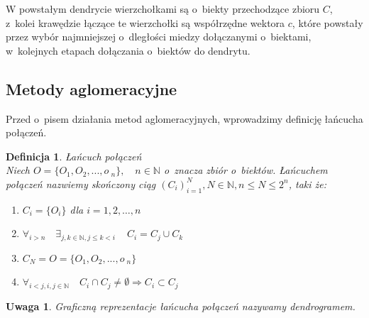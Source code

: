 \documentclass[12pt,a4paper]{report}
\newtheorem{definition}[theorem]{Definicja}
\newtheorem{uwaga}{Uwaga}
\begin{document}
W powstałym dendrycie wierzchołkami są o~biekty przechodzące zbioru $C$, z~kolei krawędzie łączące te wierzchołki są współrzędne wektora $c$, które powstały przez wybór najmniejszej o~dległości miedzy dołączanymi o~biektami, w~kolejnych etapach dołączania o~biektów do dendrytu. 

\subsection{Metody aglomeracyjne}

Przed o~pisem działania metod aglomeracyjnych, wprowadzimy definicję łańcucha połączeń.

\begin{definition}{Łańcuch połączeń}\\
Niech $O=\{O_{1},O_{2},..., o~_{n}\}, \quad n\in \mathbb{N}$ o~znacza zbiór o~biektów. Łańcuchem połączeń nazwiemy skończony ciąg $(C_{i})_{i=1}^{N},  N \in \mathbb{N}, n\leq N \leq 2^n$, taki że:
\begin{enumerate}
\item $C_{i}=\{O_{i}\}$ dla $i=1, 2, \ldots, n$
\item $\forall_{i > n} \quad \exists_{j, k \in \mathbb{N},  j\leq k < i~ } \quad C_{i}=C_{j} \cup C_{k}$
\item $C_{N}=O=\{O_{1},O_{2},..., o~_{n}\}$
\item $\forall_{i<j,  {i,j \in \mathbb{N}}} \quad C_{i} \cap C_{j} \neq \emptyset \Rightarrow  C_{i} \subset C_{j}$ 
\end{enumerate}
\end{definition}

\begin{uwaga}
Graficzną reprezentacje łańcucha połączeń nazywamy dendrogramem. 
\end{uwaga}
\end{document}
